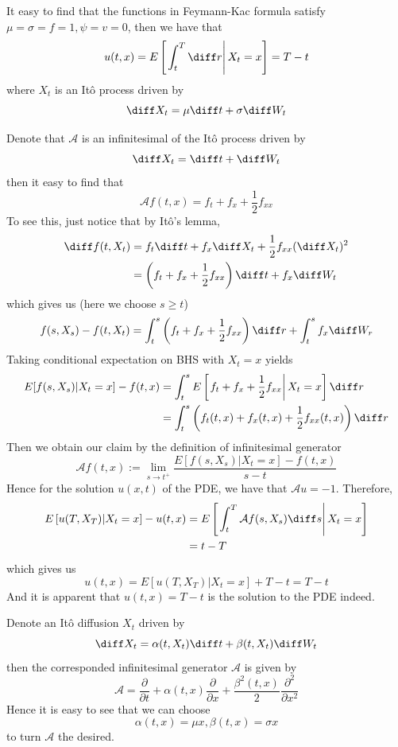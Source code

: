 \problem
\begin{subproblem}[(\alph*)]
    \item
    It easy to find that the functions in Feymann-Kac formula
    satisfy $\mu=\sigma=f=1,\psi=v=0$, then we have that 
    \[u(t,x)=E\left[\left.\int_t^T\diff r\right|X_t=x\right]
    =T-t\]
    where $X_t$ is an It\^o process driven by
    \[\diff X_t=\mu\diff t+\sigma\diff W_t\]

    \item
    Denote that $\mathcal A$ is an infinitesimal of
    the It\^o process driven by
    \[\diff X_t=\diff t+\diff W_t\]
    then it easy to find that
    \[\mathcal Af(t,x)=f_t+f_x+\frac{1}{2}f_{xx}\]
    To see this, just notice that by It\^o's lemma,
    \[\begin{aligned}
        \diff f(t,X_t)&=f_t\diff t+f_x\diff X_t+\frac{1}{2}f_{xx}(\diff X_t)^2\\
        &=\left(f_t+f_x+\frac{1}{2}f_{xx}\right)\diff t+f_x\diff W_t
    \end{aligned}\]
    which gives us (here we choose $s\geq t$)
    \[f(s,X_s)-f(t,X_t)=\int_t^s\left(f_t+f_x+\frac{1}{2}f_{xx}\right)\diff r
    +\int_t^s f_x\diff W_r\]
    Taking conditional expectation on BHS with $X_t=x$ yields
    \[\begin{aligned}
        E[f(s,X_s)|X_t=x]-f(t,x)&=\int_t^s E\left[\left.f_t+f_x+\frac{1}{2}f_{xx}\right|X_t=x\right]\diff r\\
        &=\int_t^s \left(f_t(t,x)+f_x(t,x)+\frac{1}{2}f_{xx}(t,x)\right)\diff r
    \end{aligned}\]
    Then we obtain our claim by the definition of infinitesimal generator
    \[\mathcal Af(t,x):=\lim_{s\to t^+}\frac{E[f(s,X_s)|X_t=x]-f(t,x)}{s-t}\]
    Hence for the solution $u(x,t)$ of the PDE, we have
    that $\mathcal Au=-1$.
    Therefore,
    \[\begin{aligned}
        E\left[u(T,X_T)|X_t=x\right]
        -u(t,x)&=
        E\left[\left.\int_t^{T}
        \mathcal Af(s,X_{s})\diff s\right|X_t=x\right]\\
        &=t-T
    \end{aligned}\]
    which gives us
    \[u(t,x)=E[u(T,X_T)|X_t=x]+T-t=T-t\]
    And it is apparent that $u(t,x)=T-t$ is the solution to the
    PDE indeed.
\end{subproblem}

\problem
Denote an It\^o diffusion $X_t$ driven by
\begin{equation}
    \label{eq:a b Ito}
    \diff X_t=\alpha(t,X_t)\diff t+\beta(t,X_t)\diff W_t
\end{equation}
then the corresponded infinitesimal generator $\mathcal A$
is given by
\[\mathcal A=\frac{\partial}{\partial t}+\alpha(t,x)\frac{\partial}{\partial x}
+\frac{\beta^2(t,x)}{2}\frac{\partial^2}{\partial x^2}\]
Hence it is easy to see that we can choose
\begin{equation}
    \label{eq:param}
    \alpha(t,x)=\mu x,\beta(t,x)=\sigma x
\end{equation}
to turn $\mathcal A$ the desired.

